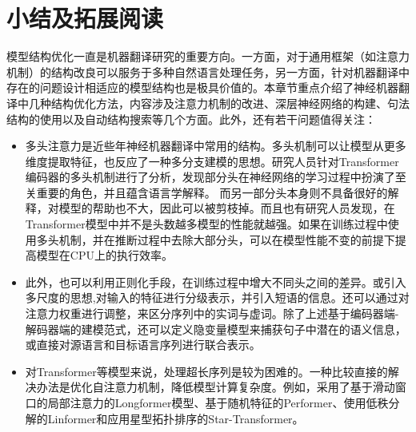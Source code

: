 
\sectionnewpage
\section{小结及拓展阅读}

\parinterval 模型结构优化一直是机器翻译研究的重要方向。一方面，对于通用框架（如注意力机制）的结构改良可以服务于多种自然语言处理任务，另一方面，针对机器翻译中存在的问题设计相适应的模型结构也是极具价值的。本章节重点介绍了神经机器翻译中几种结构优化方法，内容涉及注意力机制的改进、深层神经网络的构建、句法结构的使用以及自动结构搜索等几个方面。此外，还有若干问题值得关注：

\begin{itemize}

\vspace{0.5em}
\item 多头注意力是近些年神经机器翻译中常用的结构。多头机制可以让模型从更多维度提取特征，也反应了一种多分支建模的思想。研究人员针对Transformer编码器的多头机制进行了分析，发现部分头在神经网络的学习过程中扮演了至关重要的角色，并且蕴含语言学解释。 而另一部分头本身则不具备很好的解释，对模型的帮助也不大，因此可以被剪枝掉。而且也有研究人员发现，在Transformer模型中并不是头数越多模型的性能就越强。如果在训练过程中使用多头机制，并在推断过程中去除大部分头，可以在模型性能不变的前提下提高模型在CPU上的执行效率。

\vspace{0.5em}
\item 此外，也可以利用正则化手段，在训练过程中增大不同头之间的差异。或引入多尺度的思想,对输入的特征进行分级表示，并引入短语的信息。还可以通过对注意力权重进行调整，来区分序列中的实词与虚词。除了上述基于编码器端-解码器端的建模范式，还可以定义隐变量模型来捕获句子中潜在的语义信息，或直接对源语言和目标语言序列进行联合表示。

\vspace{0.5em}
\item 对Transformer等模型来说，处理超长序列是较为困难的。一种比较直接的解决办法是优化自注意力机制，降低模型计算复杂度。例如，采用了基于滑动窗口的局部注意力的Longformer模型、基于随机特征的Performer、使用低秩分解的Linformer和应用星型拓扑排序的Star-Transformer。

\vspace{0.5em}
\end{itemize}
